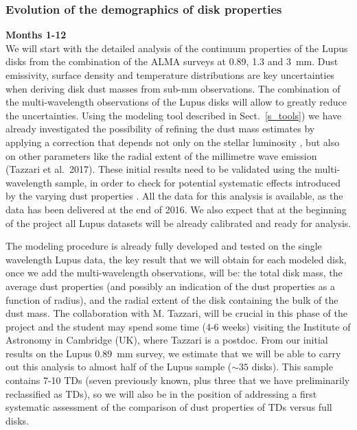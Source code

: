 \documentclass[10pt,fleqn,twoside]{article}
\begin{document}
\subsubsection{Evolution of the demographics of disk properties}

{\Tcol\bf Months 1-12}\\

We will start with the detailed analysis of the continuum properties of the Lupus disks from the combination of the ALMA surveys at 0.89, 1.3 and 3~mm. Dust emissivity, surface density and temperature
distributions are key uncertainties when deriving disk dust masses from sub-mm observations. The combination of the multi-wavelength observations of the Lupus disks will allow to greatly reduce the 
uncertainties. Using the modeling tool described in Sect.~\ref{s_tools}) we have already investigated the
possibility of refining the dust mass estimates by applying a correction that depends not only on the stellar luminosity \citep[see the attempts by][]{2013ApJ...771..129A,2016ApJ...819..102V}, but also on other parameters like the radial extent of the millimetre wave emission (Tazzari et al.~2017). These initial results need to be validated using the multi-wavelength sample, in order to check for potential systematic effects introduced by the varying dust properties \citep[see e.g.\ ][]{2011A&A...525A..12B,2013A&A...558A..64T,2016A&A...588A..53T}. All the data for this analysis is available, as the data has been delivered at the end of 2016. We also expect that at the beginning of the project all Lupus datasets will be already calibrated and ready for analysis.

The modeling procedure is already fully developed and tested on the single wavelength Lupus data, the key result that we will obtain for each modeled disk, once we add the multi-wavelength observations, will be: the total disk mass, the average dust properties (and possibly an indication of the dust properties as a function of radius), and the radial extent of the disk containing the bulk of the dust mass. The collaboration with M. Tazzari, will be crucial in this phase of the project and the student may spend 
some time (4-6 weeks) visiting the Institute of Astronomy in Cambridge (UK), where Tazzari is a postdoc. From our initial results on the Lupus 0.89~mm survey, we estimate that  we will be able to carry out this analysis to almost half of the Lupus sample ($\sim 35$ disks). This sample contains 7-10 TDs (seven previously known, plus three that we have preliminarily reclassified as TDs), so we will also be in the position of addressing a first systematic assessment of the comparison of dust properties of TDs versus full disks. 
\end{document}
